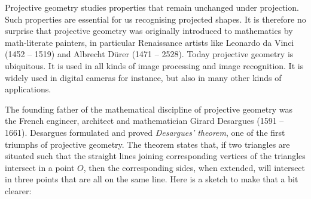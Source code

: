 \documentclass[tikz]{scrreprt}
\begin{document}
Projective geometry studies properties that remain
unchanged under projection. Such properties are essential
for us recognising projected shapes. It is therefore
no surprise that projective geometry was originally
introduced to mathematics by math-literate painters,
in particular Renaissance artists 
like Leonardo da Vinci (1452 -- 1519) and
Albrecht Dürer (1471 -- 2528). 
Today projective geometry is ubiquitous. It is used
in all kinds of image processing and image recognition.
It is widely used in digital cameras for instance,
but also in many other kinds of applications.

The founding father of the mathematical discipline
of projective geometry was the French 
engineer, architect and mathematician 
Girard Desargues (1591 -- 1661). Desargues formulated
and proved \emph{Desargues' theorem}, one of the first
triumphs of projective geometry. The theorem states that,
if two triangles are situated such that the straight lines
joining corresponding vertices of the triangles intersect
in a point $O$, then the corresponding sides, when
extended, will intersect in three points that are all
on the same line. Here is a sketch to make that
a bit clearer:

\begin{center}
\end{center}
\end{document}
